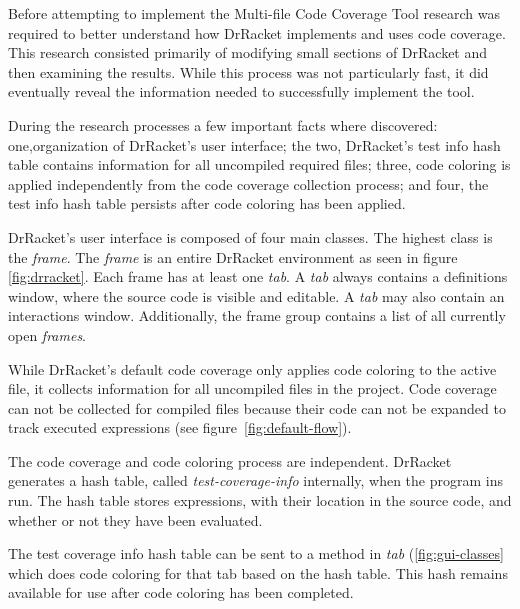 Before attempting to implement the Multi-file Code Coverage Tool research was required to better understand how DrRacket implements and uses code coverage. This research consisted primarily of modifying small sections of DrRacket and then examining the results. While this process was not particularly fast, it did eventually reveal the information needed to successfully implement the tool.

During the research processes a few important facts where discovered: one,organization of DrRacket's user interface; the two, DrRacket's test info hash table contains information for all uncompiled required files; three, code coloring is applied independently from the code coverage collection process; and four, the test info hash table persists after code coloring has been applied.

DrRacket's user interface is composed of four main classes. The highest class is the \emph{frame}. The \emph{frame} is an entire DrRacket environment as seen in figure \ref{fig:drracket}. Each frame has at least one \emph{tab}. A \emph{tab} always contains a definitions window, where the source code is visible and editable. A \emph{tab} may also contain an interactions window. Additionally, the frame group contains a list of all currently open \emph{frames}.


While DrRacket's default code coverage only applies code coloring to the active file, it collects information for all uncompiled files in the project. Code coverage can not be collected for compiled files because their code can not be expanded to track executed expressions (see figure~\ref{fig:default-flow}). 

The code coverage and code coloring process are independent. DrRacket generates a hash table, called \emph{test-coverage-info} internally, when the program ins run. The hash table stores expressions, with their location in the source code, and whether or not they have been evaluated. 

The test coverage info hash table can be sent to a method in \emph{tab} (\ref{fig:gui-classes} which does code coloring for that tab based on the hash table. This hash remains available for use after code coloring has been completed. 

